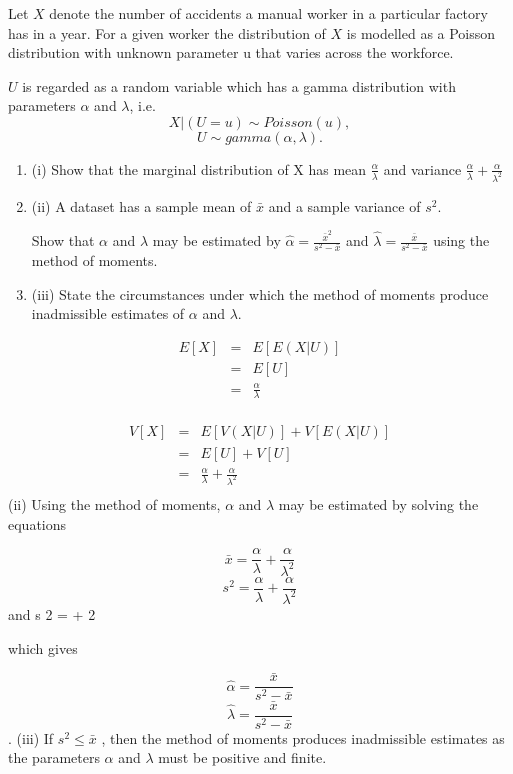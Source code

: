 \documentclass[a4paper,12pt]{article}
\begin{document}
Let $X$ denote the number of accidents a manual worker in a particular factory has in a
year. For a given worker the distribution of $X$ is modelled as a Poisson distribution
with unknown parameter u that varies across the workforce. 

$U$ is regarded as a
random variable which has a gamma distribution with parameters $\alpha$ and $\lambda$, i.e.
\[X | (U = u) \sim Poisson(u),\]
\[U \sim gamma( \alpha , \lambda).\]

\begin{enumerate}
\item (i) Show that the marginal distribution of X has mean $ {\displaystyle \frac{\alpha}{\lambda} }$ and variance
$ {\displaystyle \frac{\alpha}{\lambda} + \frac{\alpha}{\lambda^2} }$ 

\item (ii) A dataset has a sample mean of $\bar{x}$ and a sample variance of $s^2$. 

Show that $\alpha$ and $\lambda$ may be estimated by $ {\displaystyle \hat{\alpha} = \frac{\bar{x}^2}{s^2 - \bar{x}} }$
and
$ {\displaystyle \hat{\lambda} = \frac{\bar{x}}{s^2 - \bar{x}} }$
using the method of moments.

\item 
(iii) State the circumstances under which the method of moments produce
inadmissible estimates of $\alpha$ and $\lambda$. 
\end{enumerate}
\begin{eqnarray*}
E [ X ] &=& E [ E ( X | U )] \\ &=& E [ U ] \\ &=& \frac{\alpha }{\lambda}\\
\end{eqnarray*}

\begin{eqnarray*}
V [ X ] &=& E [ V ( X | U )] + V [ E ( X | U )] \\ &=& E [ U ] + V [ U ]  \\ &=& \frac{\alpha }{\lambda} + \frac{\alpha }{\lambda^2}\\
\end{eqnarray*}
(ii)
Using the method of moments, $\alpha$ and $\lambda$ may be estimated by solving the
equations

\[ \bar{x} = \frac{\alpha}{\lambda} + \frac{\alpha}{\lambda^2}\]
\[ s^2 = \frac{\alpha}{\lambda} + \frac{\alpha}{\lambda^2}\]
and s 2 = + 2

which gives

\[ \hat{\alpha} = \frac{ \bar{x} }{s^2 − \bar{x} } \]
\[ \hat{\lambda} = \frac{ \bar{x} }{s^2 − \bar{x} } \]
.
(iii) If $s^2 \leq \bar{x}$ , then the method of moments produces inadmissible estimates as the
parameters $\alpha$ and $\lambda$ must be positive and finite.
\end{document}
